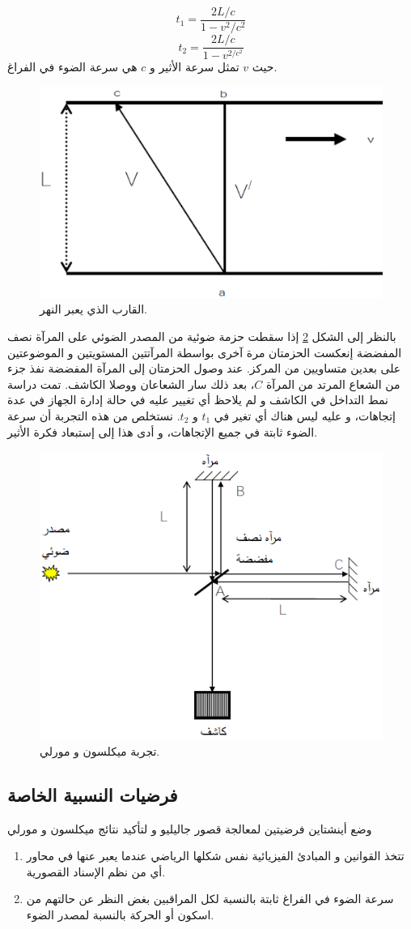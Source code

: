 \begin{equation}
	t_{1}=\dfrac{2L/c}{1-v^{2}/c^{2}}
\end{equation}
\begin{equation}
	t_{2}= \dfrac{2L/c}{1-v^{2/c^{2}}}
\end{equation}
حيث $v$ تمثل سرعة اﻷثير و $c$ هي سرعة الضوء في الفراغ.
\begin{figure}[h!]
	\centering
	\includegraphics[width=0.6\linewidth, height=0.21\textheight]{"Fig/Fig_II/الشكل 2_1"}
	\caption{القارب الذي يعبر النهر.}
	\label{fig:2_1}
\end{figure}
بالنظر إلى الشكل \ref{fig:-2_2} إذا سقطت حزمة ضوئية من المصدر الضوئي على المرآة نصف المفضضة إنعكست الحزمتان مرة آخرى بواسطة المرآتتين المستويتين و الموضوعتين على بعدين متساويين من المركز. عند وصول الحزمتان إلى المرآة المفضضة نفذ جزء من الشعاع المرتد من المرآة  $C$، بعد ذلك سار الشعاعان ووصلا الكاشف. تمت دراسة نمط التداخل في الكاشف و لم يلاحظ أي تغيير عليه في حالة إدارة الجهاز في عدة إتجاهات، و عليه ليس هناك أي تغير في $t_{1}$ و $t_{2}$. نستخلص من هذه التجربة أن سرعة الضوء ثابتة في جميع الإتجاهات، و أدى هذا إلى إستبعاد فكرة الأثير.
\begin{figure}[h!]
	\centering
	\includegraphics[width=0.6\linewidth, height=0.2\textheight]{"Fig/Fig_II/الشكل 2_2"}
	\caption{تجربة ميكلسون و مورلي.}
	\label{fig:-2_2}
\end{figure}
\subsection{فرضيات النسبية الخاصة}
وضع أينشتاين فرضيتين لمعالجة قصور جاليليو و لتأكيد نتائج ميكلسون و مورلي
\begin{enumerate}
	\item تتخذ القوانين و المبادئ الفيزيائية نفس شكلها الرياضي عندما يعبر عنها في محاور أي من نظم الإسناد القصورية.
	\item سرعة الضوء في الفراغ ثابتة بالنسبة لكل المراقبين بغض النظر عن حالتهم من اسكون أو الحركة بالنسبة لمصدر الضوء.
\end{enumerate}

